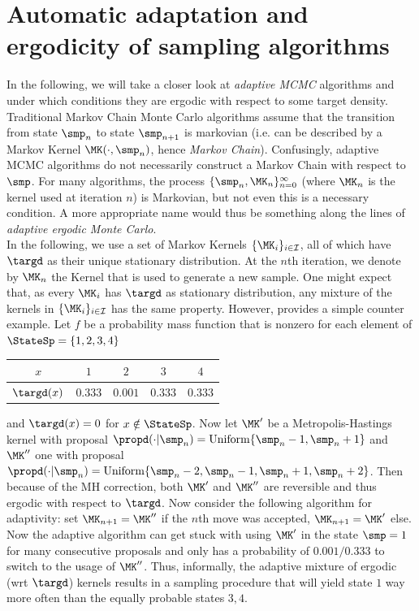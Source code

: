 \section{Automatic adaptation and ergodicity of sampling algorithms}
In the following, we will take a closer look at \emph{adaptive MCMC} algorithms and under which conditions they are ergodic with respect to some target density. Traditional Markov Chain Monte Carlo algorithms assume that the transition from state $\smp_n$ to state $\smp_{n+1}$ is markovian (i.e. can be described by a Markov Kernel $\MK(\cdot, \smp_n)$, hence \emph{Markov Chain}). Confusingly, adaptive MCMC algorithms do not necessarily construct a Markov Chain with respect to $\smp$. For many algorithms, the process $\{\smp_n,\MK_n\}_{n=0}^\infty$ (where $\MK_n$ is the kernel used at iteration $n$) is Markovian, but not even this is a necessary condition. A more appropriate name would thus be something along the lines of \emph{adaptive ergodic Monte Carlo}.\\
In the following, we use a set of Markov Kernels $\{\MK_i\}_{i \in \mathcal{I}}$, all of which have $\targd$ as their unique stationary distribution. At the $n$th iteration, we denote by $\MK_n$ the Kernel that is used to generate a new sample. One might expect that, as every $\MK_i$ has $\targd$ as stationary distribution, any mixture of the kernels in $\{\MK_i\}_{i \in \mathcal{I}}$ has the same property. However, \cite{Rosenthal2011} provides a simple counter example. Let $f$ be a probability mass function that is nonzero for each element of $\StateSp=\{1,2,3,4\}$

\begin{center}
\begin{tabular}{c|c c c c}
$x$ & $1$ & $2$ & $3$ & $4$\\
\hline 
$\targd(x)$ & $0.333$ & $0.001$ & $0.333$ & $0.333$
\end{tabular}
\end{center}

and $\targd(x) = 0$ for $x \notin \StateSp$. Now let $\MK'$ be a Metropolis-Hastings kernel with proposal $\propd(\cdot | \smp_n) = \textrm{Uniform}\{ \smp_n -1,  \smp_n+1\}$ and $\MK''$ one with proposal $\propd(\cdot | \smp_n) = \textrm{Uniform}\{\smp_n -2, \smp_n -1,  \smp_n+1, \smp_n +2\}$. Then because of the MH correction, both $\MK'$ and $\MK''$ are reversible and thus ergodic with respect to $\targd$. Now consider the following algorithm for adaptivity: set $\MK_{n+1} = \MK''$ if the $n$th move was accepted, $\MK_{n+1} = \MK'$ else. Now the adaptive algorithm can get stuck with using $\MK'$ in the state $\smp=1$ for many consecutive proposals and only has a probability of $0.001/0.333$ to switch to the usage of $\MK''$. Thus, informally, the adaptive mixture of ergodic (wrt $\targd$) kernels results in a sampling procedure that will yield state $1$ way more often than the equally probable states $3,4$.

